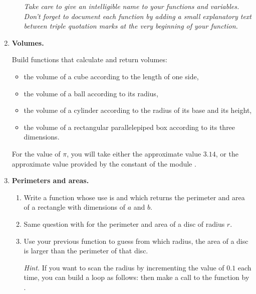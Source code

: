 \documentclass[11pt,class=report,crop=false]{standalone}
\begin{document}
\begin{activite}
\begin{enumerate}
\begin{enumerate}
    
  \emph{Take care to give an intelligible name to your functions and variables. Don't forget to document each function by adding a small explanatory text between triple quotation marks at the very beginning of your function.}
    
    
  \end{enumerate}   
  
  \item \textbf{Volumes.}
  
   Build functions that calculate and return volumes:
  \begin{itemize}
    \item the volume of a cube according to the length of one side,
    \item the volume of a ball according to its radius,
    \item the volume of a cylinder according to the radius of its base and its height,
    \item the volume of a rectangular parallelepiped box according to its three dimensions.
   \end{itemize}
   
   For the value of $\pi$, you will take either the approximate value $3.14$, or the approximate value provided by the constant  of the module .
  
  
  \item \textbf{Perimeters and areas.}
  
  \begin{enumerate}
    \item Write a function whose use is  and which returns the perimeter and area of a rectangle with dimensions of $a$ and $b$.
      
    \item Same question with  for the perimeter and area of a  disc of radius $r$.
    
    \item Use your previous function to guess from which radius, the area of a disc is larger than the perimeter of that disc.
    
    \emph{Hint.} If you want to scan the radius by incrementing the value of $0.1$ each time, you can build a loop as follows:   
    then make a call to the function by .
  \end{enumerate}
\end{enumerate}
  

\end{activite}
\end{document}
